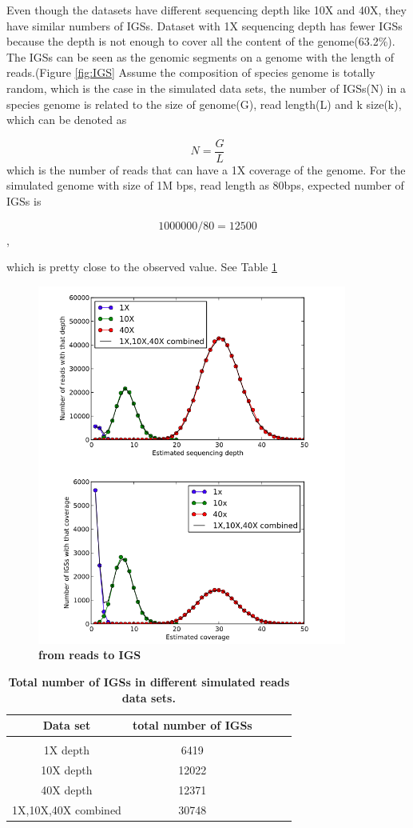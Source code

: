 Even though the datasets have different sequencing depth like 10X and 40X, 
they have similar numbers of IGSs. Dataset with 1X sequencing depth has fewer 
IGSs because the depth is not enough to cover all the content of the 
genome(63.2\%). The IGSs can be seen as the
genomic segments on a genome with the length of reads.(Figure \ref{fig:IGS}  
Assume the composition of species 
genome is totally random, which is the case in the simulated data sets, the 
number of IGSs(N) in a species genome is related to the size of genome(G), 
read length(L) and k size(k), which can be denoted as

\[N =\frac{G}{L}  \]
which is the number of reads that can have a 1X coverage of the genome.
For the simulated genome with size of 1M bps, read length as 80bps, expected 
number of IGSs is 

\[1000000/80 = 12500 \], 

which is pretty close to the observed value. See Table \ref{table:IGSs}


\begin{figure}[!ht]
\centerline{\includegraphics[width=4in]{./figures/from_reads_to_IGS.png}}
\caption{\bf from reads to IGS}
\label{fig:reads_to_IGS}
\end{figure}

\begin{table}[!ht]
\caption{
\bf{Total number of IGSs in different simulated reads data sets.}
}
\begin{tabular}{ |c | c |c| c|c| }
Data set & total number of IGSs \\
\hline \\
1X depth                   & 6419  \\
10X depth                  & 12022  \\
40X depth                  & 12371 \\
1X,10X,40X combined        & 30748 \\
\end{tabular}
\begin{flushleft}
\end{flushleft}
\label{table:IGSs}
\end{table}


